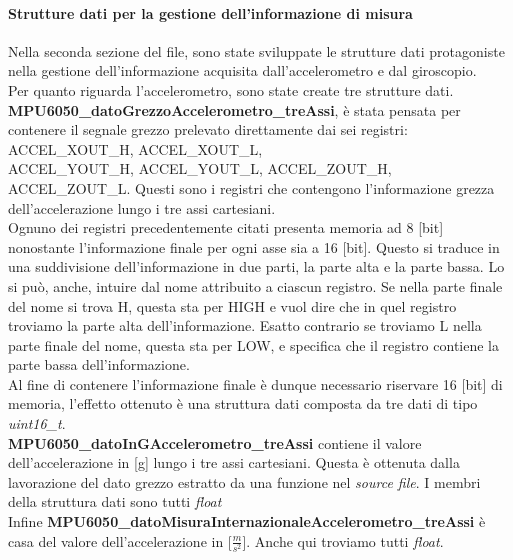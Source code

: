 \paragraph{Strutture dati per la gestione dell'informazione di misura}
Nella seconda sezione del file, sono state sviluppate le strutture dati protagoniste nella gestione dell'informazione acquisita dall'accelerometro e dal giroscopio.\\
Per quanto riguarda l'accelerometro, sono state create tre strutture dati.\\
\textbf{MPU6050\_datoGrezzoAccelerometro\_treAssi}, è stata pensata per contenere il segnale grezzo prelevato direttamente dai sei registri: ACCEL\_XOUT\_H, ACCEL\_XOUT\_L,\\ACCEL\_YOUT\_H, ACCEL\_YOUT\_L, ACCEL\_ZOUT\_H, ACCEL\_ZOUT\_L. Questi sono i registri che contengono l'informazione grezza dell'accelerazione lungo i tre assi 
cartesiani.\\  
Ognuno dei registri precedentemente citati presenta memoria ad 8 [bit] nonostante l'informazione finale per ogni asse sia a 16 [bit]. Questo si traduce in una suddivisione  dell'informazione in due parti, la parte alta e la parte bassa. Lo si può, anche, intuire dal nome attribuito a ciascun registro. Se nella parte finale del nome si trova H, questa sta per HIGH e vuol dire che in quel registro troviamo la parte alta dell'informazione. Esatto contrario se troviamo L nella parte finale del nome, questa sta per LOW, e specifica che il registro contiene la parte bassa dell'informazione.\\
Al fine di contenere l'informazione finale è dunque necessario riservare 16 [bit] di memoria, l'effetto ottenuto è una struttura dati composta da tre dati di tipo \textit{uint16\_t}.\\
\textbf{MPU6050\_datoInGAccelerometro\_treAssi} contiene il valore dell'accelerazione in [g] lungo i tre assi cartesiani. Questa è ottenuta dalla lavorazione del dato grezzo estratto da una funzione nel \textit{source file}. I membri della struttura dati sono tutti \textit{float}\\
Infine \textbf{MPU6050\_datoMisuraInternazionaleAccelerometro\_treAssi} è casa del valore dell'accelerazione in [$\frac{m}{s^2}$]. Anche qui troviamo tutti \textit{float}.

